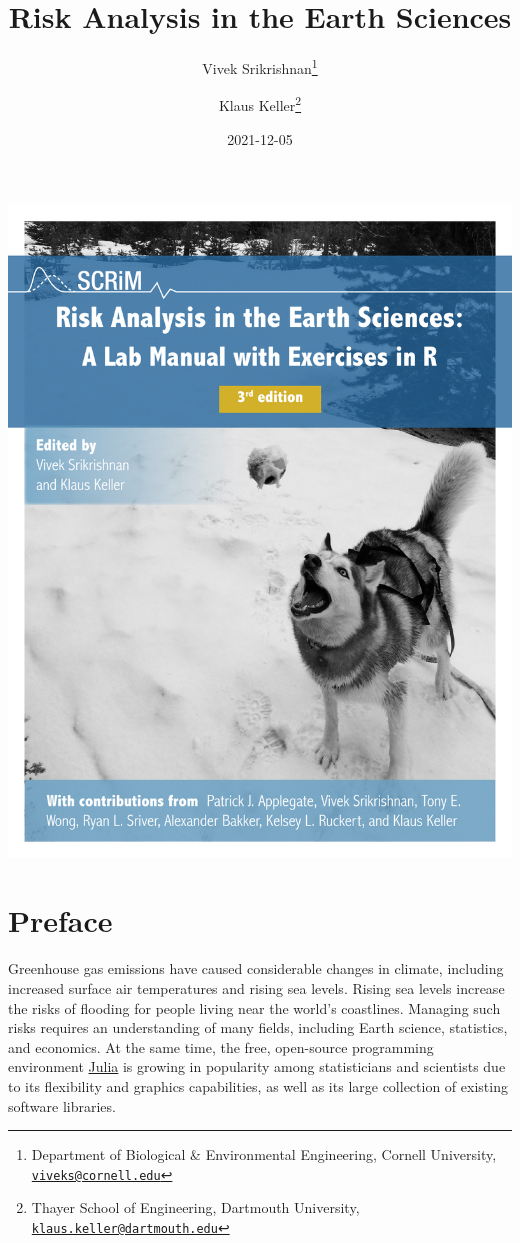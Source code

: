 \documentclass[
  11pt,
]{book}
\title{Risk Analysis in the Earth Sciences}
\author{Vivek Srikrishnan\footnote{Department of Biological \& Environmental Engineering, Cornell University, \href{mailto:viveks@cornell.edu}{\nolinkurl{viveks@cornell.edu}}} \and Klaus Keller\footnote{Thayer School of Engineering, Dartmouth University, \href{mailto:klaus.keller@dartmouth.edu}{\nolinkurl{klaus.keller@dartmouth.edu}}}}
\date{2021-12-05}
\begin{document}
\begin{center}
\includegraphics{images/cover_with_alexander.pdf}
\end{center}
\thispagestyle{empty}

\clearpage

\restoregeometry


\maketitle


{
\hypersetup{linkcolor=}
\setcounter{tocdepth}{2}
\tableofcontents
}
\hypertarget{preface}{%
\chapter*{Preface}\label{preface}}


Greenhouse gas emissions have caused considerable changes in climate, including increased surface air temperatures and rising sea levels. Rising sea levels increase the risks of flooding for people living near the world's coastlines. Managing such risks requires an understanding of many fields, including Earth science, statistics, and economics. At the same time, the free, open-source programming environment \href{http://www.julialang.org}{Julia} is growing in popularity among statisticians and scientists due to its flexibility and graphics capabilities, as well as its large collection of existing software libraries.
\end{document}
